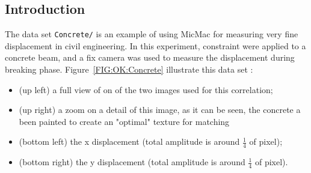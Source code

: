 \label{Concrete}

\subsection{Introduction}

The data set {\tt Concrete/} is an example of using MicMac for measuring very fine displacement in civil engineering. In this experiment, constraint were applied to a concrete beam, and a fix camera was used to measure the displacement during breaking phase. Figure~\ref{FIG:OK:Concrete} illustrate this data set :

\begin{itemize}
    \item  (up left) a full view of on of the two images used for this correlation;
    \item  (up right) a zoom on a detail of this image, as it can be seen, the concrete a been
           painted to create an "optimal" texture for matching
    \item  (bottom left) the x displacement (total amplitude is around $\frac{1}{4}$ of pixel);
    \item  (bottom right) the y displacement (total amplitude is around $\frac{1}{4}$ of pixel).
\end{itemize}

